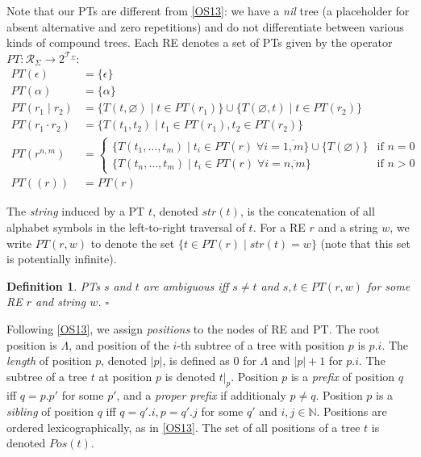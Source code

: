 \documentclass[AMA,STIX1COL]{WileyNJD-v2}
\newcommand{\XP}{\mathcal{P}}
\newcommand{\XR}{\mathcal{R}}
\newcommand{\XT}{\mathcal{T}}
\newcommand{\YN}{\mathbb{N}}
\newtheorem{Xdef}{Definition}
\begin{document}
Note that our PTs are different from \ref{OS13}:
we have a \emph{nil} tree (a placeholder for absent alternative and zero repetitions)
and do not differentiate between various kinds of compound trees.
Each RE denotes a set of PTs given by the operator $PT: \XR_\Sigma \rightarrow 2^{\XT_\Sigma}$:
    \begin{align*}
        PT(\epsilon) &= \{ {\epsilon} \}
        \\
        PT(\alpha) &= \{ {\alpha} \}
        \\
        PT(r_1 \mid r_2) &=
            \big\{ {T}(t, \varnothing) \mid t \in PT(r_1) \big\} \cup
            \big\{ {T}(\varnothing, t) \mid t \in PT(r_2) \big\}
        \\
        PT(r_1 \cdot r_2) &=
            \big\{ {T}(t_1, t_2) \mid
                t_1 \in PT(r_1),
                t_2 \in PT(r_2)
            \big\} \\
        PT(r^{n, m}) &=
            \begin{cases}
                \big\{ {T}(t_1, \dots, t_m) \mid t_i \in PT(r) \;
                    \forall i = \overline{1, m} \big\} \cup \{ {T}(\varnothing) \} &\text{if } n = 0 \\
                \big\{ {T}(t_n, \dots, t_m) \mid t_i \in PT(r) \;
                    \forall i = \overline{n, m} \big\} &\text{if } n > 0
            \end{cases}
        \\
        PT( (r) ) &= PT(r)
    \end{align*}

The \emph{string} induced by a PT $t$, denoted $str(t)$, is the concatenation of all alphabet symbols in the left-to-right traversal of $t$.
For a RE $r$ and a string $w$, we write $PT(r, w)$ to denote the set $\{ t \in PT(r) \mid str(t) = w \}$
(note that this set is potentially infinite).

    \begin{Xdef}\label{ambiguity_of_parse_trees}
    PTs $s$ and $t$ are \emph{ambiguous} iff $s \neq t$ and $s, t \in PT(r, w)$ for some RE $r$ and string $w$.
    $\square$
    \end{Xdef}

Following \ref{OS13}, we assign \emph{positions} to the nodes of RE and PT.
The root position is $\Lambda$, and position of the $i$-th subtree of a tree with position $p$ is $p.i$.
The \emph{length} of position $p$, denoted $|p|$, is defined as $0$ for $\Lambda$ and $|p| + 1$ for $p.i$.
The subtree of a tree $t$ at position $p$ is denoted $t|_p$.
Position $p$ is a \emph{prefix} of position $q$ iff $q = p.p'$ for some $p'$,
and a \emph{proper prefix} if additionaly $p \neq q$.
Position $p$ is a \emph{sibling} of position $q$ iff $q = q'.i, p = q'.j$ for some $q'$ and $i,j \in \YN$.
Positions are ordered lexicographically, as in \ref{OS13}.
The set of all positions of a tree $t$ is denoted $Pos(t)$.
\end{document}

